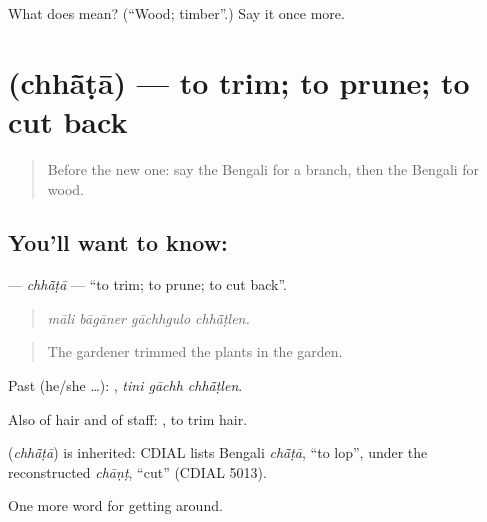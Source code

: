 \begin{tcolorbox}[breakable,colback=teal!4,colframe=teal!35!black,title={Before you move on}]
What does  mean? (\textquotedblleft{}Wood; timber\textquotedblright{}.) Say it once more.
\end{tcolorbox}
\section[\texorpdfstring{\bn{ছাঁটা} (chhā̃ṭā)}{ছাঁটা (chhā̃ṭā)}]{ (chhā̃ṭā) — to trim; to prune; to cut back}

\label{lesson:BN-C435-chhata}



\begin{quote}
Before the new one: say the Bengali for a branch, then the Bengali for wood.
\end{quote}

\subsection*{You'll want to know: }
\textbf{} — \emph{chhā̃ṭā} — \textquotedblleft{}to trim; to prune; to cut back\textquotedblright{}.

\begin{quote}
   
\end{quote}

\begin{quote}
\emph{māli bāgāner gāchhgulo chhā̃ṭlen.}
\end{quote}

\begin{quote}
The gardener trimmed the plants in the garden.
\end{quote}

Past (he/she …):   , \emph{tini gāchh chhā̃ṭlen}.

Also of hair and of staff:  , to trim hair.

\begin{cousinweb}
\textbf{} (\emph{chhā̃ṭā}) is inherited: CDIAL lists Bengali \emph{chā̃ṭā}, \textquotedblleft{}to lop\textquotedblright{}, under the reconstructed \emph{chāṇṭ}, \textquotedblleft{}cut\textquotedblright{} (CDIAL 5013).
\end{cousinweb}

\begin{grammarlens}[title={What you've built}]
One more word for getting around.
\end{grammarlens}

